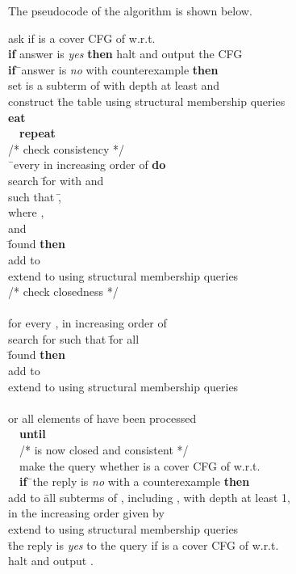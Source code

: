 \documentclass[preprint,12pt,english]{article}
\begin{document}
The pseudocode of the algorithm is shown below. 
\begin{tabbing}
ask if  is a cover CFG of  w.r.t. \\
{\bf if} answer is {\em yes} {\bf then} halt and output the CFG \\
{\bf if}\=\ answer is {\em no} with counterexample  {\bf then}\\
\>set  is a subterm of  with depth at least  and \\
\>construct \=the table  using structural membership queries\\
\={\bf{eat}}\\
\>\ \ {\bf repeat}\\
\>\>/* check consistency */\\
\>\=\ every  in increasing order of  {\bf do}\\
\>\>\>search \=for  with  and \\
\>\>\>\>such that \=,\\
\>\>\>\>\> where ,\\
\>\>\>\>\>and \\
\>\> \=found {\bf then}\\
\>\>\>\>add  to \\
\>\>\>\>extend  to  using structural membership queries\\
\>\>/* check closedness */\\
\>\>\\
\> for every , in increasing order of \\
\>\>\>search for  such that \= for all  \\
\>\> \=found {\bf then}\\
\>\>\>\>add  to \\
\>\>\>\>extend  to  using structural membership queries\\
\>\>\>\>\\
\>  or all elements of  have been processed\\
\>\ \ {\bf until} \\
\>\ \ /*  is now closed and consistent */ \\
\>\ \ make the query whether  is a cover CFG of  w.r.t. \\
\>\ \ {\bf if}\=\ the reply is {\em no} with a counterexample  {\bf then}\\
\>\>add to  \=all subterms of , including , with depth at least 1, \\
\>\>\>in the increasing order given by \\
\>\>extend  to  using structural membership queries\\
 \=the reply is {\em yes} to the query if  is a cover CFG of  w.r.t. \\
\>halt and output .
\end{tabbing}
\end{document}
